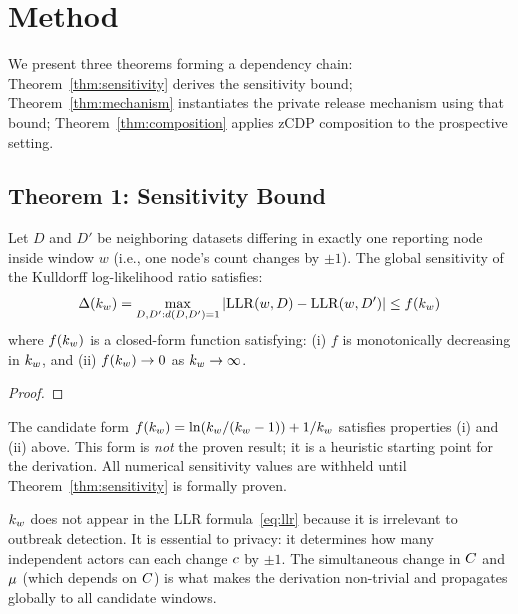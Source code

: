 
\section{Method}
\label{sec:method}

We present three theorems forming a dependency chain:
Theorem~\ref{thm:sensitivity} derives the sensitivity bound;
Theorem~\ref{thm:mechanism} instantiates the private release mechanism using that bound;
Theorem~\ref{thm:composition} applies zCDP composition to the prospective setting.


\subsection{Theorem 1: Sensitivity Bound}
\label{sec:method:sensitivity}

\begin{theorem}
\label{thm:sensitivity}
Let $D$ and $D'$ be neighboring datasets differing in exactly one reporting node
inside window $w$ (i.e., one node's count changes by $\pm 1$).
The global sensitivity of the Kulldorff log-likelihood ratio satisfies:
\[
    \Delta(k_w) = \max_{D, D' : d(D,D')=1} |\mathrm{LLR}(w, D) - \mathrm{LLR}(w, D')| \leq f(k_w)
\]
where $f(k_w)$ is a closed-form function satisfying:
(i) $f$ is monotonically decreasing in $k_w$, and
(ii) $f(k_w) \to 0$ as $k_w \to \infty$.
\end{theorem}

\begin{proof}
\end{proof}

\begin{remark}
The candidate form $f(k_w) = \ln(k_w / (k_w - 1)) + 1/k_w$ satisfies properties (i)
and (ii) above.
This form is \emph{not} the proven result; it is a heuristic starting point for the
derivation.
All numerical sensitivity values are withheld until Theorem~\ref{thm:sensitivity}
is formally proven.
\end{remark}

\begin{remark}
$k_w$ does not appear in the LLR formula~\eqref{eq:llr} because it is irrelevant to
outbreak detection.
It is essential to privacy: it determines how many independent actors can each
change $c$ by $\pm 1$.
The simultaneous change in $C$ and $\mu$ (which depends on $C$) is what
makes the derivation non-trivial and propagates globally to all candidate windows.
\end{remark}

